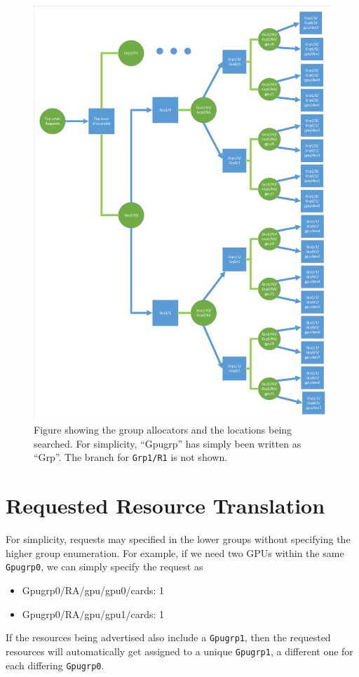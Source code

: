 \documentclass[12pt,onecolumn]{IEEEtran}
\begin{document}
\begin{figure}  
\begin{center}  
\includegraphics[width=6in]{alloc.pdf}
\caption{Figure showing the group allocators and the locations
being searched. For simplicity, ``Gpugrp'' has simply been written as ``Grp''.
The branch for \texttt{Grp1/R1} is not shown.
\label{fig:alloc}}
\end{center}  
\end{figure}


\section{Requested Resource Translation}

For simplicity, requests may specified in the lower groups without
specifying the higher group enumeration.
For example, if we need two GPUs within the same \texttt{Gpugrp0}, we can simply
specify the request as
\ttfamily
\begin{itemize}
\item[] Gpugrp0/RA/gpu/gpu0/cards: 1
\item[] Gpugrp0/RA/gpu/gpu1/cards: 1
\end{itemize}
\normalfont
If the resources being advertised also include a \texttt{Gpugrp1}, then
the requested resources will automatically get assigned
to a unique \texttt{Gpugrp1}, a different one for each differing
\texttt{Gpugrp0}.
\end{document}
